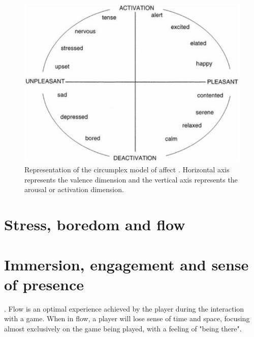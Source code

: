 \begin{figure}[h!]
    \centering
    \includegraphics[scale=0.8]{figures/russell-av.png}
    \caption{Representation of the circumplex model of affect \parencite{posner2005circumplex}. Horizontal axis represents the valence dimension and the vertical axis represents the arousal or activation dimension.}
    \label{fig:av-model}
\end{figure}

\section{Stress, boredom and flow}


\section{Immersion, engagement and sense of presence}

. Flow is an optimal experience achieved by the player during the interaction with a game. When in flow, a player will lose sense of time and space, focusing almost exclusively on the game being played, with a feeling of "being there".

